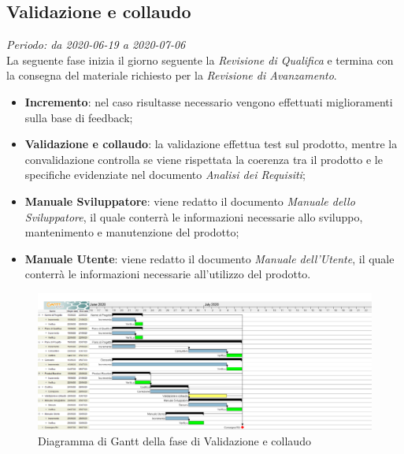 \subsection{Validazione e collaudo}
\textit{Periodo: da 2020-06-19 a 2020-07-06}\\
La seguente fase inizia il giorno seguente la \textit{Revisione di Qualifica} e termina con la consegna del materiale richiesto per la \textit{Revisione di Avanzamento}.
\begin{itemize}
\item \textbf{Incremento}: nel caso risultasse necessario vengono effettuati miglioramenti sulla base di feedback;
\item \textbf{Validazione e collaudo}: la validazione effettua test sul prodotto, mentre la convalidazione controlla se viene rispettata la coerenza tra il prodotto e le specifiche evidenziate nel documento \textit{Analisi dei Requisiti};
\item \textbf{Manuale Sviluppatore}: viene redatto il documento \textit{Manuale dello Sviluppatore}, il quale conterrà le informazioni necessarie allo sviluppo, mantenimento e manutenzione del prodotto;
\item \textbf{Manuale Utente}: viene redatto il documento \textit{Manuale dell'Utente}, il quale conterrà le informazioni necessarie all'utilizzo del prodotto.
\end{itemize}

\begin{figure}[H]
\centering
\includegraphics[scale=0.24]{./img/gantt/validazione_collaudo.png}
\caption{Diagramma di Gantt della fase di Validazione e collaudo}
\end{figure}